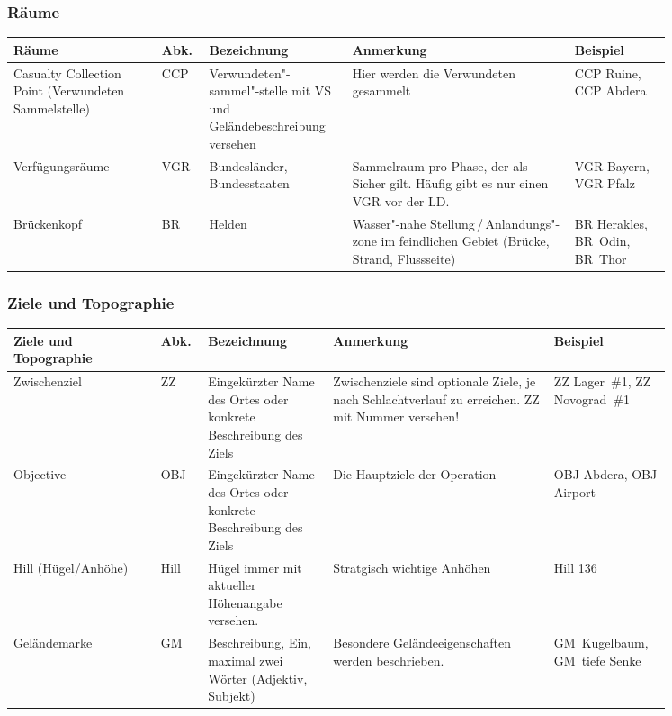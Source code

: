 \subsubsection{Räume}
\begin{longtable}{P{0.2\linewidth}P{0.05\linewidth}P{0.17\linewidth}P{0.3\linewidth}P{0.13\linewidth}}
	\toprule
	Räume &	Abk. & Bezeichnung & Anmerkung & Beispiel\\ 
	\midrule
	Casualty Collection Point (Verwundeten Sammelstelle) & CCP & Verwundeten"-sammel"-stelle mit VS und Geländebeschreibung versehen & Hier werden die Verwundeten gesammelt & CCP Ruine, CCP Abdera\\
	\midrule
	Verfügungsräume	& VGR & Bundesländer, Bundesstaaten	& Sammelraum pro Phase, der als Sicher gilt. Häufig gibt es nur einen VGR vor der LD. & VGR Bayern, VGR Pfalz \\
	\midrule
	Brückenkopf & BR & Helden & Wasser"-nahe Stellung\,/\,Anlandungs"-zone im feindlichen Gebiet (Brücke, Strand, Flussseite) & BR Herakles, BR~Odin, BR~Thor \\ 
	\bottomrule
\end{longtable}

\subsubsection{Ziele und Topographie}
\begin{longtable}{P{0.2\linewidth}P{0.05\linewidth}P{0.17\linewidth}P{0.3\linewidth}P{0.13\linewidth}}
	\toprule		
	Ziele und Topographie & Abk. & Bezeichnung & Anmerkung & Beispiel \\ 
	\midrule
	Zwischenziel & ZZ &	Eingekürzter Name des Ortes oder konkrete Beschreibung des Ziels &	Zwischenziele sind optionale Ziele, je nach Schlachtverlauf zu erreichen. ZZ mit Nummer versehen! & ZZ Lager~\#1, ZZ Novograd~\#1 \\ 
	\midrule
	Objective & OBJ & Eingekürzter Name des Ortes oder konkrete Beschreibung des Ziels & Die Hauptziele der Operation & OBJ Abdera, OBJ Airport\\ 
	\midrule
	Hill (Hügel/Anhöhe) & Hill & Hügel immer mit aktueller Höhenangabe versehen. & Stratgisch wichtige Anhöhen & Hill 136\\ 
	\midrule
	Geländemarke & GM & Beschreibung, Ein, maximal zwei Wörter (Adjektiv, Subjekt) & Besondere Geländeeigenschaften werden beschrieben. &  GM~Kugelbaum, GM~tiefe Senke\\ 
	\bottomrule
\end{longtable}

